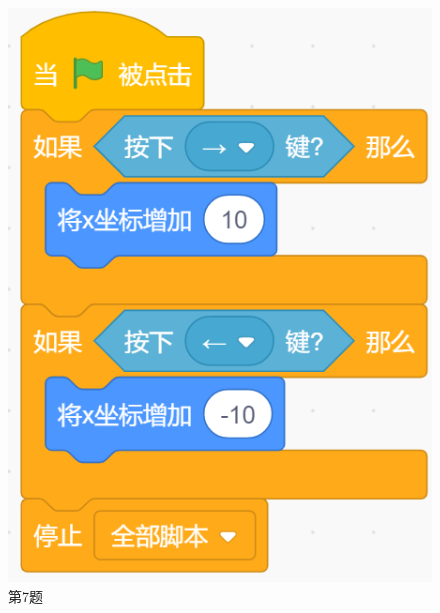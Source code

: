\documentclass[10pt, a4paper]{article}
\begin{document}
\begin{enumerate}
\begin{figure}[htbp]
\begin{minipage}[t]{.17\textwidth}
                \includegraphics[width=\textwidth]{7.png}
                \caption*{第7题}
            \end{minipage}
            \begin{minipage}[t]{.17\textwidth}
                \centering

\end{minipage}
\end{figure}
\end{enumerate}
\end{document}
